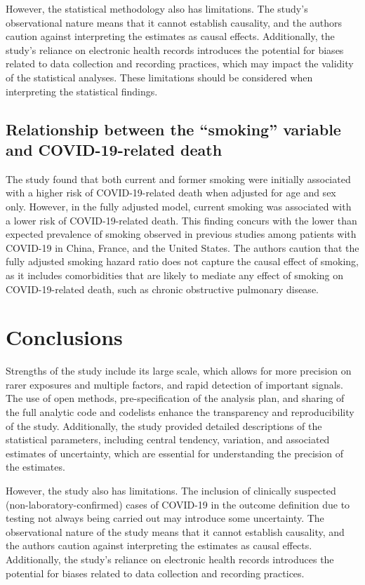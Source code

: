 \documentclass{article}
\begin{document}
However, the statistical methodology also has limitations. The study's observational nature means that it cannot establish causality, and the authors caution against interpreting the estimates as causal effects. Additionally, the study's reliance on electronic health records introduces the potential for biases related to data collection and recording practices, which may impact the validity of the statistical analyses. These limitations should be considered when interpreting the statistical findings.

\subsection*{Relationship between the ``smoking'' variable and COVID-19-related death}

The study found that both current and former smoking were initially associated with a higher risk of COVID-19-related death when adjusted for age and sex only. However, in the fully adjusted model, current smoking was associated with a lower risk of COVID-19-related death. This finding concurs with the lower than expected prevalence of smoking observed in previous studies among patients with COVID-19 in China, France, and the United States. 
The authors caution that the fully adjusted smoking hazard ratio does not capture the causal effect of smoking, as it includes comorbidities that are likely to mediate any effect of smoking on COVID-19-related death, such as chronic obstructive pulmonary disease.


\section{Conclusions}

Strengths of the study include its large scale, which allows for more precision on rarer exposures and multiple factors, and rapid detection of important signals. The use of open methods, pre-specification of the analysis plan, and sharing of the full analytic code and codelists enhance the transparency and reproducibility of the study. Additionally, the study provided detailed descriptions of the statistical parameters, including central tendency, variation, and associated estimates of uncertainty, which are essential for understanding the precision of the estimates.

However, the study also has limitations. The inclusion of clinically suspected (non-laboratory-confirmed) cases of COVID-19 in the outcome definition due to testing not always being carried out may introduce some uncertainty. The observational nature of the study means that it cannot establish causality, and the authors caution against interpreting the estimates as causal effects. Additionally, the study's reliance on electronic health records introduces the potential for biases related to data collection and recording practices.
\end{document}
